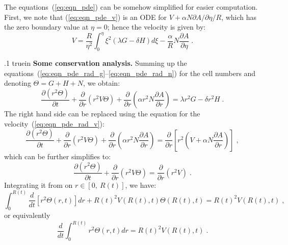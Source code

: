 \documentclass{amsart}
\theoremstyle{definition}
\theoremstyle{remark}
\numberwithin{equation}{section}
\numberwithin{figure}{section}
\newcommand{\po}[1]{\frac{\partial}{\partial{#1}}}
\newcommand{\pp}[2]{\frac{\partial {#1}}{\partial {#2}}}
\newcommand{\pph}[2]{\partial {#1}/\partial {#2}}
\begin{document}
The equations~(\ref{eq:eqn_pde}) can be somehow simplified for easier computation.
First, we note that (\ref{eq:eqn_pde_v}) is an ODE for $V+\alpha N\pph{A}{\eta}/R$, which has the zero boundary value at $\eta=0$; hence the velocity is given by:
\begin{equation}\label{eq:eqn_pde_v_sol}
V = \frac{R}{\eta^2}\int_0^\eta\xi^2(\lambda G-\delta H)d\xi - \frac{\alpha}{R}N\pp{A}{\eta}\;.
\end{equation}

{\color{blue}
\vglue .1 truein
\noindent
{\bf Some conservation analysis.}
Summing up the equations~(\ref{eq:eqn_pde_rad_g}--\ref{eq:eqn_pde_rad_n}) for the cell numbers and denoting $\Theta=G+H+N$, we obtain:
\begin{displaymath}
\pp{(r^2\Theta)}{t} + \po{r}\left(r^2V\Theta\right) + \po{r}\left(\alpha r^2N\pp{A}{r}\right) = \lambda r^2G-\delta r^2H\;.
\end{displaymath}
The right hand side can be replaced using the equation for the velocity~(\ref{eq:eqn_pde_rad_v}):
\begin{displaymath}
\pp{(r^2\Theta)}{t} + \po{r}\left(r^2V\Theta\right) + \po{r}\left(\alpha r^2N\pp{A}{r}\right) = \po{r}\left[r^2\left(V+\alpha N\pp{A}{r}\right)\right]\;,
\end{displaymath}
which can be further simplifies to:
\begin{displaymath}
\pp{(r^2\Theta)}{t} + \po{r}\left(r^2V\Theta\right) = \po{r}\left(r^2V\right)\;.
\end{displaymath}
Integrating it from on $r\in[0,\ R(t)]$, we have:
\begin{displaymath}
\int_0^{R(t)}\frac{d}{dt}\left[r^2\Theta(r,t)\right]dr + R(t)^2V(R(t),t)\Theta(R(t),t) = R(t)^2V(R(t),t)\;,
\end{displaymath}
or equivalently
\begin{displaymath}
\frac{d}{dt}\int_0^{R(t)}r^2\Theta(r,t)dr = R(t)^2V(R(t),t)\;.
\end{displaymath}
}
\end{document}
